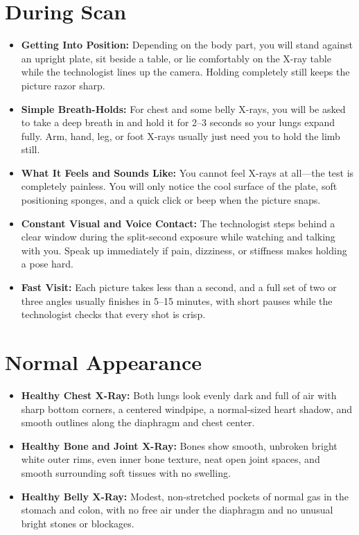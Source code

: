 \section{During Scan}

\begin{itemize}
    \item \textbf{Getting Into Position:} Depending on the body part, you will stand against an upright plate, sit beside a table, or lie comfortably on the X-ray table while the technologist lines up the camera. Holding completely still keeps the picture razor sharp.
    \item \textbf{Simple Breath-Holds:} For chest and some belly X-rays, you will be asked to take a deep breath in and hold it for 2--3 seconds so your lungs expand fully. Arm, hand, leg, or foot X-rays usually just need you to hold the limb still.
    \item \textbf{What It Feels and Sounds Like:} You cannot feel X-rays at all---the test is completely painless. You will only notice the cool surface of the plate, soft positioning sponges, and a quick click or beep when the picture snaps.
    \item \textbf{Constant Visual and Voice Contact:} The technologist steps behind a clear window during the split-second exposure while watching and talking with you. Speak up immediately if pain, dizziness, or stiffness makes holding a pose hard.
    \item \textbf{Fast Visit:} Each picture takes less than a second, and a full set of two or three angles usually finishes in 5--15 minutes, with short pauses while the technologist checks that every shot is crisp.
\end{itemize}

\section{Normal Appearance}

\begin{itemize}
    \item \textbf{Healthy Chest X-Ray:} Both lungs look evenly dark and full of air with sharp bottom corners, a centered windpipe, a normal-sized heart shadow, and smooth outlines along the diaphragm and chest center.
    \item \textbf{Healthy Bone and Joint X-Ray:} Bones show smooth, unbroken bright white outer rims, even inner bone texture, neat open joint spaces, and smooth surrounding soft tissues with no swelling.
    \item \textbf{Healthy Belly X-Ray:} Modest, non-stretched pockets of normal gas in the stomach and colon, with no free air under the diaphragm and no unusual bright stones or blockages.
\end{itemize}

